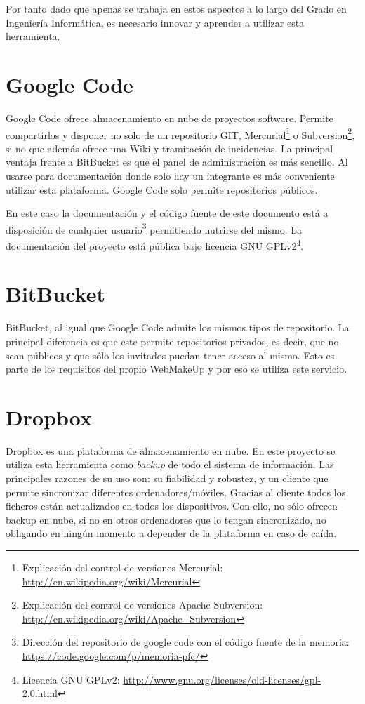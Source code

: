 Por tanto dado que apenas se trabaja en estos aspectos a lo largo del Grado en Ingeniería Informática, es necesario innovar y aprender a utilizar esta herramienta.

\section{Google Code}
\label{sec:GoogleCode}
Google Code ofrece almacenamiento en nube de proyectos software. Permite compartirlos y disponer no solo de un repositorio GIT, Mercurial\footnote{Explicación del control de versiones Mercurial: \url{http://en.wikipedia.org/wiki/Mercurial}} o Subversion\footnote{Explicación del control de versiones Apache Subversion: \url{http://en.wikipedia.org/wiki/Apache_Subversion}}, si no que además ofrece una Wiki y tramitación de incidencias. La principal ventaja frente a BitBucket es que el panel de administración es más sencillo. Al usarse para documentación donde solo hay un integrante es más conveniente utilizar esta plataforma. Google Code solo permite repositorios públicos.

En este caso la documentación y el código fuente de este documento está a disposición de cualquier usuario\footnote{Dirección del repositorio de google code con el código fuente de la memoria: \url{https://code.google.com/p/memoria-pfc/}} permitiendo nutrirse del mismo. La documentación del proyecto está pública bajo licencia GNU GPLv2\footnote{Licencia GNU GPLv2: \url{http://www.gnu.org/licenses/old-licenses/gpl-2.0.html}}.

\section{BitBucket}
\label{sec:BitBucket}
BitBucket, al igual que Google Code admite los mismos tipos de repositorio. La principal diferencia es que este permite repositorios privados, es decir, que no sean públicos y que sólo los invitados puedan tener acceso al mismo. Esto es parte de los requisitos del propio WebMakeUp y por eso se utiliza este servicio.


\section{Dropbox}
\label{sec:Dropbox}
Dropbox es una plataforma de almacenamiento en nube. En este proyecto se utiliza esta herramienta como \emph{backup} de todo el sistema de información. Las principales razones de su uso son: su fiabilidad y robustez, y un cliente que permite sincronizar diferentes ordenadores/móviles. Gracias al cliente todos los ficheros están actualizados en todos los dispositivos. Con ello, no sólo ofrecen backup en nube, si no en otros ordenadores que lo tengan sincronizado, no obligando en ningún momento a depender de la plataforma en caso de caída.


